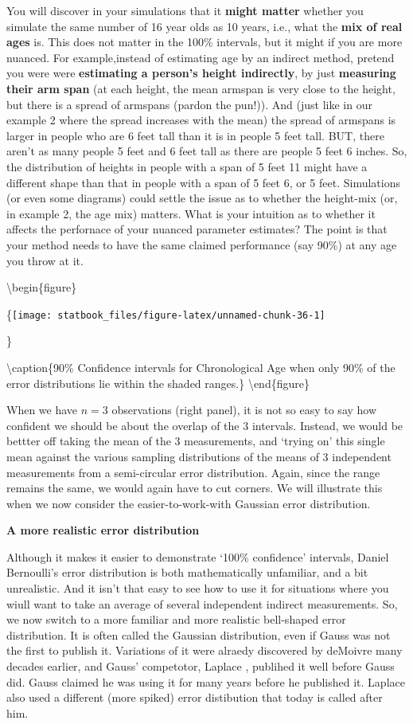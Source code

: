 \documentclass[]{book}
\begin{document}
You will discover in your simulations that it \textbf{might matter} whether you simulate the same number of 16 year olds as 10 years, i.e., what the \textbf{mix of real ages} is. This does not matter in the 100\% intervals, but it might if you are more nuanced. For example,instead of estimating age by an indirect method, pretend you were were \textbf{estimating a person's height indirectly}, by just \textbf{measuring their arm span} (at each height, the mean armspan is very close to the height, but there is a spread of armspans (pardon the pun!)). And (just like in our example 2 where the spread increases with the mean) the spread of armspans is larger in people who are 6 feet tall than it is in people 5 feet tall.
BUT, there aren't as many people 5 feet and 6 feet tall as there are people 5 feet 6 inches. So, the distribution of heights in people with a span of 5 feet 11 might have a different shape than that in people with a span of 5 feet 6, or 5 feet. Simulations (or even some diagrams) could settle the issue as to whether the height-mix (or, in example 2, the age mix) matters. What is your intuition as to whether it affects the perfornace of your nuanced parameter estimates? The point is that your method needs to have the same claimed performance (say 90\%) at any age you throw at it.

\textbackslash{}begin\{figure\}

\{\centering \texttt{[image: statbook\_files/figure-latex/unnamed-chunk-36-1]}

\}

\textbackslash{}caption\{90\% Confidence intervals for Chronological Age when only 90\% of the error distributions lie within the shaded ranges.\}\label{fig:unnamed-chunk-36}
\textbackslash{}end\{figure\}

When we have \(n = 3\) observations (right panel), it is not so easy to say how confident we should be about the overlap of the 3 intervals.
Instead, we would be bettter off taking the mean of the 3 measurements, and `trying on' this single mean against the various sampling distributions of the means of 3 independent measurements from a semi-circular error distribution. Again, since the range remains the same, we would again have to cut corners. We will illustrate this when we now consider the easier-to-work-with Gaussian error distribution.

\textbf{A more realistic error distribution}

Although it makes it easier to demonstrate `100\% confidence' intervals, Daniel Bernoulli's error distribution is both mathematically unfamiliar, and a bit unrealistic. And it isn't that easy to see how to use it for situations where you wiull want to take an average of several independent indirect measurements. So, we now switch to a more familiar and more realistic bell-shaped error distribution. It is often called the Gaussian distribution, even if Gauss was not the first to publish it. Variations of it were alraedy discovered by deMoivre many decades earlier, and Gauss' competotor, Laplace , publihed it well before Gauss did. Gauss claimed he was using it for many years before he published it.
Laplace also used a different (more spiked) error distibution that today is called after him.
\end{document}
